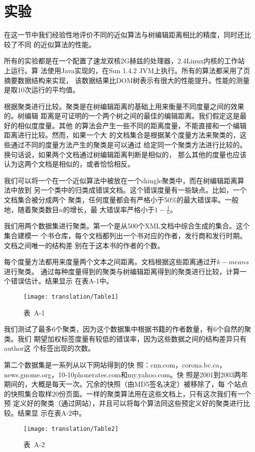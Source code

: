 \section{实验}
在这一节中我们经验性地评价不同的近似算法与树编辑距离相比的精度，同时还比较了不同
的近似算法的性能。

所有的实验都是在一个配置了速龙双核2G赫兹的处理器，2.4Linux内核的工作站上运行。算
法使用Java实现的，在Sun 1.4.2 JVM上执行。所有的算法都采用了页摘要数据结构来实现，
该数据结果比DOM树表示有很大的性能提升。性能的测量是取10次运行的平均值。

根据聚类进行比较。聚类是在树编辑距离的基础上用来衡量不同度量之间的效果的。树编辑
距离是可证明的一个两个树之间的最佳的编辑距离。我们假定这是最好的相似度度量。其他
的算法会产生一些不同的距离度量，不能直接和一个编辑距离进行比较。然而，如果一个大
的文档集合是根据某个度量方法来聚类的，这些通过不同的度量方法产生的聚类是可以通过
给定同一个聚类方法进行比较的。换句话说，如果两个文档通过树编辑距离判断是相似的，
那么其他的度量也应该认为这两个文档是相似的，或者恰恰相反。

我们可以将一个在一个近似算法中被放在一个shingle聚类中，而在树编辑距离算法中放到
另一个类中的归类成错误文档。这个错误度量有一些缺点。比如，一个文档集合被分成两个
聚类，任何度量都会有严格小于50\%的最大错误率。一般地，随着聚类数目$n$的增长，最
大错误率严格小于$1-\frac{1}{n}$。

我们用两个数据集进行聚类。第一个是从500个XML文档中综合生成的集合。这个集合建模一
个书仓库，每个文档都列出一个书对应的作者，发行商和发行时期。文档之间唯一的结构差
别在于这本书的作者的个数。

每个度量方法都用来度量两个文本之间距离。文档根据这些距离通过开$k-means$进行聚类。
通过每种度量得到的聚类与树编辑距离得到的聚类进行比较，计算一个错误估计。结果显示
在表A-1中。
\begin{figure}[h]
  \centering
  \caption*{表~A-1}
  \texttt{[image: translation/Table1]}
\end{figure}

我们测试了最多6个聚类，因为这个数据集中根据书籍的作者数量，有6个自然的聚类。我们
期望加权标签度量有较低的错误率，因为这些数据之间的结构差异只有{author}这
个标签出现的次数。

第二个数据集是一系列从以下网站得到的快
照：cnn.com，corona.bc.ca，news.gnome.org，10-10phonerates.com和my.yahoo.com。快
照是2001到2003两年期间的，大概是每天一次。冗余的快照（由MD5签名决定）被移除了，每
个站点的快照集合取样20份页面。一样的聚类算法用在这些文档上，只有这次我们有一个预
定义好的聚类（通过网站），并且可以将每个算法同这些预定义好的聚类进行比较。结果显
示在表A-2中。
\begin{figure}  
  \centering
  \caption*{表~A-2}
\texttt{[image: translation/Table2]}
\end{figure}

